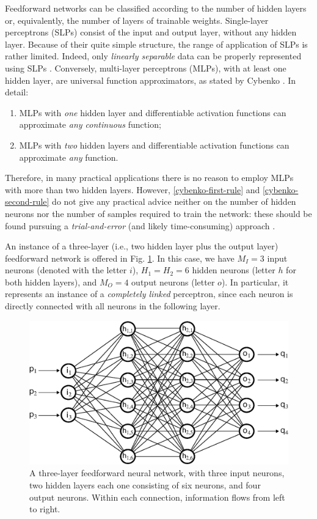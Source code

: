 \documentclass{elsarticle}
\numberwithin{equation}{section}
\theoremstyle{theorem}
\theoremstyle{definition}
\theoremstyle{remark}
\theoremstyle{proposition}
\numberwithin{figure}{section}
\begin{document}
		Feedforward networks can be classified according to the number of hidden layers or, equivalently, the number of layers of trainable weights. Single-layer perceptrons (SLPs) consist of the input and output layer, without any hidden layer. Because of their quite simple structure, the range of application of SLPs is rather limited. Indeed, only \emph{linearly separable} data can be properly represented using SLPs \cite{Kri07}. Conversely, multi-layer perceptrons (MLPs), with at least one hidden layer, are universal function approximators, as stated by Cybenko \cite{Cyb88, Cyb89}. In detail:
		\begin{enumerate}[label=(\roman*)]
			\item MLPs with \emph{one} hidden layer and differentiable activation functions can approximate \emph{any continuous} function; %
			\label{cybenko-first-rule}
			\item MLPs with \emph{two} hidden layers and differentiable activation functions can approximate \emph{any} function. %
			\label{cybenko-second-rule}
		\end{enumerate}
		Therefore, in many practical applications there is no reason to employ MLPs with more than two hidden layers. However, \ref{cybenko-first-rule} and \ref{cybenko-second-rule} do not give any practical advice neither on the number of hidden neurons nor the number of samples required to train the network: these should be found pursuing a \emph{trial-and-error} (and likely time-consuming) approach \cite{Hag14}.
		
		An instance of a three-layer (i.e., two hidden layer plus the output layer) feedforward network is offered in Fig. \ref{fig:neural-network}. In this case, we have $M_I = 3$ input neurons (denoted with the letter $i$), $H_1 = H_2 = 6$ hidden neurons (letter $h$ for both hidden layers), and $M_O = 4$ output neurons (letter $o$). In particular, it represents an instance of a \emph{completely linked} perceptron, since each neuron is directly connected with all neurons in the following layer.
				
		\begin{figure}[t]
			\center
			\includegraphics[scale = 0.55]{neural_network_bis.eps}
			
			\caption{A three-layer feedforward neural network, with three input neurons, two hidden layers each one consisting of six neurons, and four output neurons. Within each connection, information flows from left to right.}
			\label{fig:neural-network}
		\end{figure}
		
\end{document}
